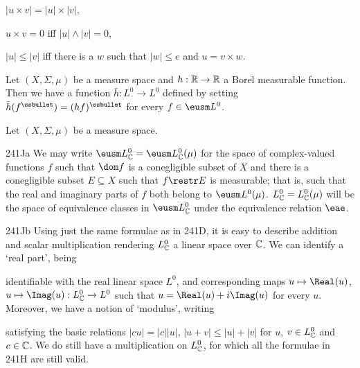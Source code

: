 \qquad $|u\times v|=|u|\times |v|$,

\qquad $u\times v=0$ iff  $|u|\wedge|v|=0$,

\qquad $|u|\le|v|$ iff there is a $w$ such that
$|w|\le e$ and $u=v\times w$.

 Let
$(X,\Sigma,\mu)$ be a measure space and $h:\Bbb R\to\Bbb R$ a Borel
measurable function.   Then we have a function $\bar h:L^0\to L^0$ defined by
setting
$\bar h(f^{\ssbullet})=(hf)^{\ssbullet}$ for every $f\in\eusm L^0$.



   Let $(X,\Sigma,\mu)$ be a measure space.

\spheader 241Ja We may write
$\eusm L^0_{\Bbb C}=\eusm L^0_{\Bbb C}(\mu)$ for the space of
complex-valued functions $f$ such that $\dom f$ is a conegligible subset of $X$ and there is a conegligible subset
$E\subseteq X$ such that $f\restr E$ is measurable;  that is, such that
the real and imaginary parts of $f$ both belong to $\eusm L^0(\mu)$.
 $L^0_{\Bbb C}=L^0_{\Bbb C}(\mu)$ will be the space of
equivalence classes in $\eusm L^0_{\Bbb C}$ under the equivalence
relation $\eae$.

\spheader 241Jb Using just the same formulae as in 241D, it is
easy to describe addition and scalar multiplication rendering $L^0_{\Bbb
C}$ a linear space over $\Bbb C$.   We can identify a `real part', being


\noindent {}identifiable with the real linear space
$L^0$, and
corresponding maps $u\mapsto\Real(u)$, $u\mapsto\Imag(u):L^0_{\Bbb C}\to
L^0$ such that $u=\Real(u)+i\Imag(u)$ for every $u$.   Moreover, we have
a notion of `modulus', writing


\noindent satisfying the basic relations $|cu|=|c||u|$,
$|u+v|\le|u|+|v|$ for $u$, $v\in L^0_{\Bbb C}$ and
$c\in\Bbb C$.
We do still have a multiplication on $L^0_{\Bbb C}$,
for which all the formulae in 241H are still valid.

